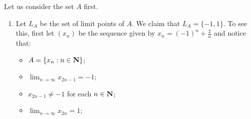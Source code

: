 \documentclass{lew98_solutions}
\begin{document}
\begin{solution}
    Let us consider the set \( A \) first.
    \begin{enumerate}
        \item Let \( L_A \) be the set of limit points of \( A \). We claim that \( L_A = \{ -1, 1 \} \). To see this, first let \( (x_n) \) be the sequence given by \( x_n = (-1)^n + \tfrac{2}{n} \) and notice that:
        \begin{itemize}
            \item \( A = \{ x_n : n \in \mathbf{N} \} \);

            \item \( \lim_{n \to \infty} x_{2n-1} = -1 \);

            \item \( x_{2n-1} \neq -1 \) for each \( n \in \mathbf{N} \);

            \item \( \lim_{n \to \infty} x_{2n} = 1 \);


\end{itemize}
\end{enumerate}
\end{solution}
\end{document}
